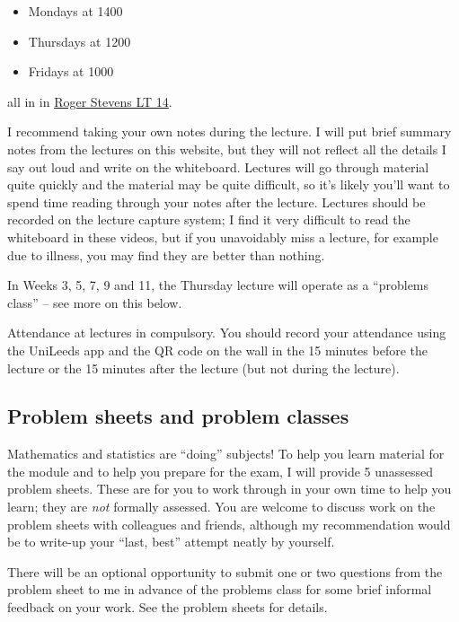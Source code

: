 \documentclass[
  letterpaper,
  DIV=11,
  numbers=noendperiod]{scrreprt}
\theoremstyle{plain}
\theoremstyle{definition}
\theoremstyle{definition}
\theoremstyle{remark}
\begin{document}
\begin{itemize}
\item
  Mondays at 1400
\item
  Thursdays at 1200
\item
  Fridays at 1000
\end{itemize}

all in in
\href{https://students.leeds.ac.uk/buildings-and-rooms/3611/roger-stevens-lt-14-10m-14}{Roger
Stevens LT 14}.

I recommend taking your own notes during the lecture. I will put brief
summary notes from the lectures on this website, but they will not
reflect all the details I say out loud and write on the whiteboard.
Lectures will go through material quite quickly and the material may be
quite difficult, so it's likely you'll want to spend time reading
through your notes after the lecture. Lectures should be recorded on the
lecture capture system; I find it very difficult to read the whiteboard
in these videos, but if you unavoidably miss a lecture, for example due
to illness, you may find they are better than nothing.

In Weeks 3, 5, 7, 9 and 11, the Thursday lecture will operate as a
``problems class'' -- see more on this below.

Attendance at lectures in compulsory. You should record your attendance
using the UniLeeds app and the QR code on the wall in the 15 minutes
before the lecture or the 15 minutes after the lecture (but not during
the lecture).

\subsection*{Problem sheets and problem
classes}\label{problem-sheets-and-problem-classes}

Mathematics and statistics are ``doing'' subjects! To help you learn
material for the module and to help you prepare for the exam, I will
provide 5 unassessed problem sheets. These are for you to work through
in your own time to help you learn; they are \emph{not} formally
assessed. You are welcome to discuss work on the problem sheets with
colleagues and friends, although my recommendation would be to write-up
your ``last, best'' attempt neatly by yourself.

There will be an optional opportunity to submit one or two questions
from the problem sheet to me in advance of the problems class for some
brief informal feedback on your work. See the problem sheets for
details.
\end{document}
